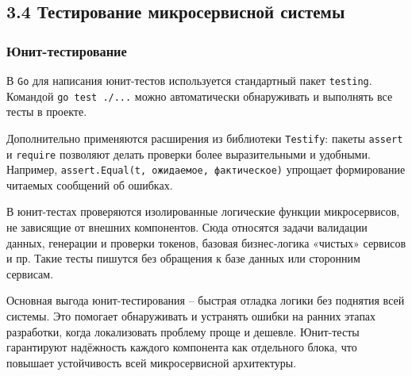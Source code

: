 \subsection*{3.4 Тестирование микросервисной системы}

\subsubsection*{Юнит-тестирование}
В \texttt{Go} для написания юнит-тестов используется стандартный пакет \texttt{testing}. Командой \texttt{go test ./...} можно автоматически обнаруживать и выполнять все тесты в проекте.

Дополнительно применяются расширения из библиотеки \texttt{Testify}: пакеты \texttt{assert} и \texttt{require} позволяют делать проверки более выразительными и удобными. Например, \texttt{assert.Equal(t, ожидаемое, фактическое)} упрощает формирование читаемых сообщений об ошибках.

В юнит-тестах проверяются изолированные логические функции микросервисов, не зависящие от внешних компонентов. Сюда относятся задачи валидации данных, генерации и проверки токенов, базовая бизнес-логика «чистых» сервисов и пр. Такие тесты пишутся без обращения к базе данных или сторонним сервисам.

Основная выгода юнит-тестирования – быстрая отладка логики без поднятия всей системы. Это помогает обнаруживать и устранять ошибки на ранних этапах разработки, когда локализовать проблему проще и дешевле. Юнит-тесты гарантируют надёжность каждого компонента как отдельного блока, что повышает устойчивость всей микросервисной архитектуры.

